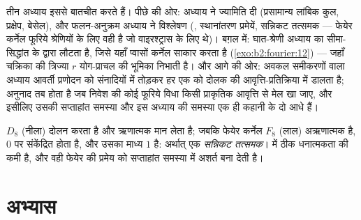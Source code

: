 \begin{remark}[इसी खंड के भीतर के परिप्रेक्ष्य]
तीन अध्याय इससे बातचीत करते हैं। पीछे की ओर:  अध्याय ने ज्यामिति
दी (प्रसामान्य लांबिक कुल, प्रक्षेप, बेसेल), और फलन-अनुक्रम अध्याय ने
विश्लेषण (, स्थानांतरण प्रमेयें, सन्निकट तत्समक --- फेयेर
कर्नेल फूरिये श्रेणियों के लिए वही है जो  वाइरश्ट्रास के
लिए थे)। बग़ल में: घात-श्रेणी अध्याय का सीमा-सिद्धांत  के द्वारा
लौटता है, जिसे यहाँ प्वासों कर्नेल साकार करता है (\cref{exo:b2:fourier:12}) --- जहाँ चक्रिका की
त्रिज्या $r$ योग-प्राचल की भूमिका निभाती है। और आगे की ओर: अवकल समीकरणों
वाला अध्याय आवर्ती प्रणोदन को संनादियों में तोड़कर हर एक को दोलक की
आवृत्ति-प्रतिक्रिया में डालता है; अनुनाद तब होता है जब निवेश की कोई फूरिये
विधा किसी प्राकृतिक आवृत्ति से मेल खा जाए, और इसीलिए उसकी सप्ताहांत समस्या
और इस अध्याय की समस्या एक ही कहानी के दो आधे हैं।
\end{remark}

\begin{omfigure}

{\small {} $D_8$ (नीला) दोलन करता है और ऋणात्मक मान लेता है;
जबकि फेयेर कर्नेल $F_8$ (लाल) अऋणात्मक है, $0$ पर संकेंद्रित होता है, और
उसका माध्य $1$ है: अर्थात् एक \emph{सन्निकट तत्समक}।  में
ठीक धनात्मकता की कमी है, और वही फेयेर की प्रमेय को सप्ताहांत समस्या में
अशर्त बना देती है।}
\end{omfigure}

\section{अभ्यास}

